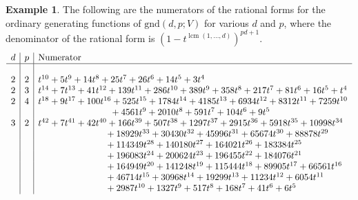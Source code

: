 \documentclass[12pt]{amsart}
\theoremstyle{definition}
\newtheorem{example}[thm]{Example}
\numberwithin{equation}{section}
\renewcommand\>{\rangle}
\newcommand\<{\langle}
\newcommand\0{\mathbf{0}}
\DeclareMathOperator\lcm{lcm} %
\newcommand\gnd{\mathrm{gnd}}
\begin{document}
\begin{example}
	The following are the numerators of the rational forms for the ordinary generating functions of $\gnd(d,p;V)$ for various $d$ and $p$, where the denominator of the rational form is $(1-t^{\lcm(1,\ldots,d)})^{pd+1}$.
	\[
	\begin{array}{c|c|l}
		d & p  & \text{Numerator} \\
		\hline & & \\
		2 & 2 & t^{10} + 5t^{9} + 14t^{8} + 25t^{7} + 26t^{6} + 14t^{5} + 3t^{4} \\
		2 & 3 & t^{14} + 7t^{13} + 41t^{12} + 139t^{11} + 286t^{10} + 389t^{9} + 358t^{8} + 217t^{7} + 81t^{6} + 16t^{5} + t^{4} \\
		2 & 4 & t^{18} + 9t^{17} + 100t^{16} + 525t^{15} + 1784t^{14} + 4185t^{13} + 6934t^{12} + 8312t^{11} + 7259t^{10} \\ 
		&  & \phantom{aaaaaaaaaaaaaaa} + 4561t^{9} + 2010t^{8} + 591t^{7} + 104t^{6} + 9t^{5}\\
		3 & 2 & t^{42} + 7t^{41} + 42t^{40} + 166t^{39} + 507t^{38} + 1297t^{37} + 2915t^{36} + 5918t^{35} + 10998t^{34} \\
		& & \phantom{aaaaaaaaaaaaaa}+ 18929t^{33} + 30430t^{32} + 45996t^{31} + 65674t^{30} + 88878t^{29} \\
		& & \phantom{aaaaaaaaaaaaaa} + 114349t^{28} + 140180t^{27} + 164021t^{26} + 183384t^{25} \\ 
		& & \phantom{aaaaaaaaaaaaaa}+ 196083t^{24} + 200624t^{23} + 196455t^{22} + 184076t^{21} \\
		& & \phantom{aaaaaaaaaaaaaa}+ 164949t^{20} + 141248t^{19} + 115444t^{18} + 89905t^{17} + 66561t^{16} \\
		& & \phantom{aaaaaaaaaaaaaa}+ 46714t^{15} + 30968t^{14} + 19299t^{13} + 11234t^{12} + 6054t^{11} \\
		& & \phantom{aaaaaaaaaaaaaa} + 2987t^{10} + 1327t^{9} + 517t^{8} + 168t^{7} + 41t^{6} + 6t^{5}	
	\end{array}
	\]
\end{example}
\end{document}
